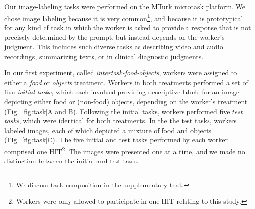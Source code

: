 \documentclass[12pt]{article}
\begin{document}
%

Our image-labeling tasks were performed on the MTurk microtask platform.  
We chose image labeling because it is very common\footnote{
	We discuss task composition in the supplementary text.
},
and because it is prototypical for any kind of task in which the worker is 
asked to provide a response that is not precisely determined by 
the prompt, but instead depends on the worker's judgment.  
This includes such diverse tasks as describing video and audio recordings, 
summarizing texts, or in clinical diagnostic judgments.

In our first experiment, called \textit{intertask-food-objects},
workers were assigned to either a
\textit{food} or \textit{objects} treatment.  Workers in both treatments
performed a set of five \textit{initial tasks}, which each involved 
providing descriptive labels for an image depicting 
either food or (non-food) objects, depending on the worker's 
treatment (Fig.~\ref{fig:task}A and B).  Following the initial 
tasks, workers performed five \textit{test tasks}, which were identical for 
both treatments.  In the the test tasks, workers labeled images, each of 
which depicted a mixture of food and objects (Fig.~\ref{fig:task}C).  
The five initial 
and test tasks performed by each worker comprised one HIT\footnote{
	Workers were only allowed to participate in one HIT relating to this study.
}. The images were presented one at a time, and we made no 
distinction between the initial and test tasks.
\end{document}
